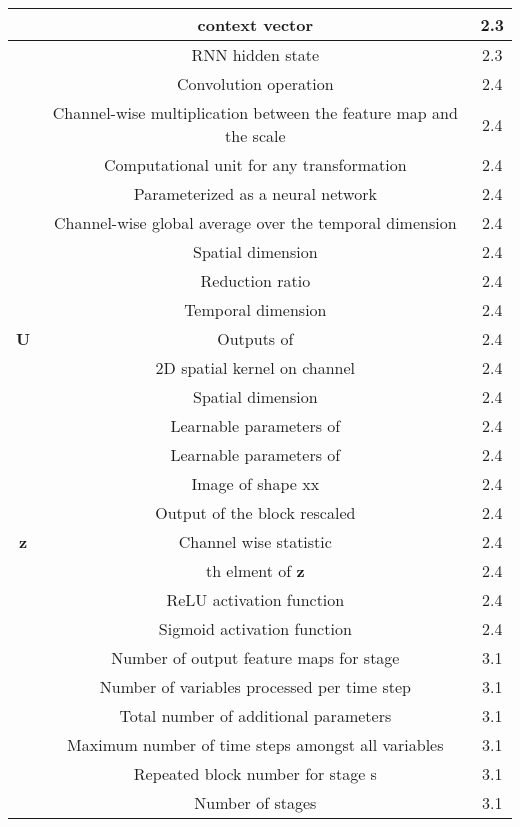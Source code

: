 \documentclass[preprint,12pt,3p]{elsarticle}
\begin{document}
\begin{table*}[htpb]
\begin{adjustbox}{width=0.71 \linewidth}
\begin{tabularx}{1.55 \textwidth}{|c|C|c|}
    \hline
     & context vector & 2.3 \\
    \hline
     & RNN hidden state & 2.3 \\
    \hline
         & Convolution operation & 2.4 \\
    \hline
     & Channel-wise multiplication between the feature map and the scale & 2.4 \\
    \hline
     & Computational unit for any transformation & 2.4 \\
    \hline
     & Parameterized as a neural network & 2.4 \\
    \hline
     & Channel-wise global average over the temporal dimension  & 2.4 \\
    \hline
       & Spatial dimension & 2.4 \\
    \hline
       & Reduction ratio & 2.4 \\
    \hline
       & Temporal dimension & 2.4 \\
    \hline
    \textbf{U}   & Outputs of  & 2.4 \\
    \hline
     & 2D spatial kernel on channel  & 2.4 \\
    \hline
       & Spatial dimension & 2.4 \\
    \hline
     & Learnable parameters of  & 2.4 \\
    \hline
     & Learnable parameters of  & 2.4 \\
    \hline
       & Image of shape xx & 2.4 \\
    \hline
     & Output of the block rescaled & 2.4 \\
    \hline
    \textbf{z}   & Channel wise statistic & 2.4 \\
    \hline
     & th elment of \textbf{z} & 2.4 \\
    \hline
     & ReLU activation function & 2.4 \\
    \hline
         & Sigmoid activation function & 2.4 \\
    \hline
     & Number of output feature maps for stage  & 3.1 \\
    \hline
       & Number of variables processed per time step & 3.1 \\
    \hline
       & Total number of additional parameters & 3.1 \\
    \hline
       & Maximum number of time steps amongst all variables & 3.1 \\
    \hline
     & Repeated block number for stage s & 3.1 \\
    \hline
       & Number of stages & 3.1 \\

\end{tabularx}
\end{adjustbox}
\end{table*}
\end{document}
